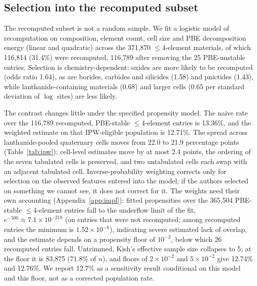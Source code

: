 \documentclass[11pt]{article}
\begin{document}
\subsection{Selection into the recomputed subset}\label{sec:ipw}

The recomputed subset is not a random sample. We fit a logistic model of recomputation
on composition, element count, cell size and PBE decomposition energy (linear and
quadratic) across the 371{,}870 $\le$4-element materials, of which 116{,}814 (31.4\%)
were recomputed, 116{,}789 after removing the 25 PBE-unstable entries. Selection is chemistry-dependent: oxides are more likely to be
recomputed (odds ratio 1.64), as are borides, carbides and silicides (1.58) and
pnictides (1.43), while lanthanide-containing materials (0.68) and larger cells (0.65
per standard deviation of $\log$ sites) are less likely.

The contrast changes little under the specified propensity model. The naive rate over the
116{,}789 recomputed, PBE-stable $\le$4-element entries is 13.36\%, and the weighted
estimate on that IPW-eligible population is 12.71\%. The spread across lanthanide-pooled quaternary cells moves
from 22.0 to 21.9 percentage points (Table~\ref{tab:ipw}); cell-level estimates move by
at most 2.4 points, the ordering of the seven tabulated cells is preserved, and two
untabulated cells each swap with an adjacent tabulated cell. Inverse-probability weighting corrects
only for selection on the observed features entered into the model; if the authors
selected on something we cannot see, it does not correct for it. The weights need their
own accounting (Appendix~\ref{app:impl}): fitted propensities over the 365{,}504 PBE-stable $\le$4-element entries fall to the
underflow limit of the fit, $e^{-500} \approx 7.1\times10^{-218}$ (on entries that were not recomputed; among recomputed entries the
minimum is $1.52\times10^{-6}$), indicating severe estimated lack of overlap, and the
estimate depends on a propensity floor of $10^{-2}$, below which
26 recomputed entries fall. Untrimmed, Kish's effective sample size collapses to 5; at the floor it is
83{,}875 (71.8\% of $n$), and floors of $2\times10^{-2}$ and $5\times10^{-2}$ give
12.74\% and 12.76\%. We report 12.7\% as a sensitivity result conditional on this model
and this floor, not as a corrected population rate.
\end{document}
